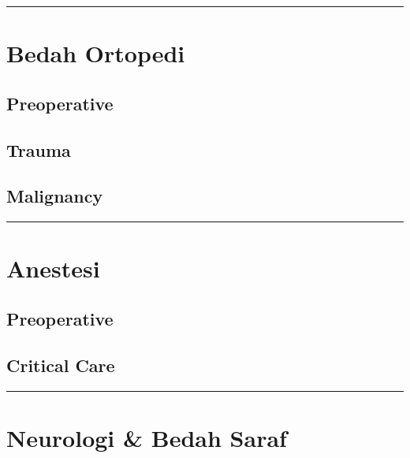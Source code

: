 \documentclass[
]{book}
\begin{document}
\begin{center}\rule{0.5\linewidth}{0.5pt}\end{center}

\hypertarget{bedah-ortopedi}{%
\section{Bedah Ortopedi}\label{bedah-ortopedi}}

\hypertarget{preoperative}{%
\subsection{Preoperative}\label{preoperative}}

\hypertarget{trauma}{%
\subsection{Trauma}\label{trauma}}

\hypertarget{malignancy-2}{%
\subsection{Malignancy}\label{malignancy-2}}

\begin{center}\rule{0.5\linewidth}{0.5pt}\end{center}

\hypertarget{anestesi-1}{%
\section{Anestesi}\label{anestesi-1}}

\hypertarget{preoperative-1}{%
\subsection{Preoperative}\label{preoperative-1}}

\hypertarget{critical-care}{%
\subsection{Critical Care}\label{critical-care}}

\begin{center}\rule{0.5\linewidth}{0.5pt}\end{center}

\hypertarget{neurologi-bedah-saraf}{%
\section{Neurologi \& Bedah Saraf}\label{neurologi-bedah-saraf}}
\end{document}
